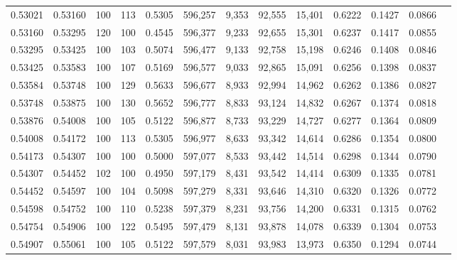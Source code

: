 \begin{tabular}{rrrrrrrrrrrrr}
0.53021 & 0.53160 &   100 & 113 &                                     0.5305 & 596,257 &   9,353 &  92,555 &  15,401 & 0.6222 & 0.1427 & 0.0866 \\
0.53160 & 0.53295 &   120 & 100 &                                     0.4545 & 596,377 &   9,233 &  92,655 &  15,301 & 0.6237 & 0.1417 & 0.0855 \\
0.53295 & 0.53425 &   100 & 103 &                                     0.5074 & 596,477 &   9,133 &  92,758 &  15,198 & 0.6246 & 0.1408 & 0.0846 \\
0.53425 & 0.53583 &   100 & 107 &                                     0.5169 & 596,577 &   9,033 &  92,865 &  15,091 & 0.6256 & 0.1398 & 0.0837 \\
0.53584 & 0.53748 &   100 & 129 &                                     0.5633 & 596,677 &   8,933 &  92,994 &  14,962 & 0.6262 & 0.1386 & 0.0827 \\
0.53748 & 0.53875 &   100 & 130 &                                     0.5652 & 596,777 &   8,833 &  93,124 &  14,832 & 0.6267 & 0.1374 & 0.0818 \\
0.53876 & 0.54008 &   100 & 105 &                                     0.5122 & 596,877 &   8,733 &  93,229 &  14,727 & 0.6277 & 0.1364 & 0.0809 \\
0.54008 & 0.54172 &   100 & 113 &                                     0.5305 & 596,977 &   8,633 &  93,342 &  14,614 & 0.6286 & 0.1354 & 0.0800 \\
0.54173 & 0.54307 &   100 & 100 &                                     0.5000 & 597,077 &   8,533 &  93,442 &  14,514 & 0.6298 & 0.1344 & 0.0790 \\
0.54307 & 0.54452 &   102 & 100 &                                     0.4950 & 597,179 &   8,431 &  93,542 &  14,414 & 0.6309 & 0.1335 & 0.0781 \\
0.54452 & 0.54597 &   100 & 104 &                                     0.5098 & 597,279 &   8,331 &  93,646 &  14,310 & 0.6320 & 0.1326 & 0.0772 \\
0.54598 & 0.54752 &   100 & 110 &                                     0.5238 & 597,379 &   8,231 &  93,756 &  14,200 & 0.6331 & 0.1315 & 0.0762 \\
0.54754 & 0.54906 &   100 & 122 &                                     0.5495 & 597,479 &   8,131 &  93,878 &  14,078 & 0.6339 & 0.1304 & 0.0753 \\
0.54907 & 0.55061 &   100 & 105 &                                     0.5122 & 597,579 &   8,031 &  93,983 &  13,973 & 0.6350 & 0.1294 & 0.0744 \\

\end{tabular}
